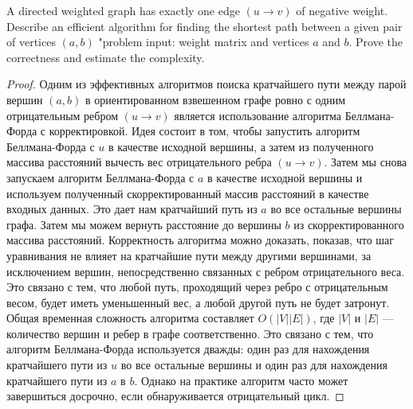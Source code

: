 \begin{prob}
A directed weighted graph has exactly one edge $(u \rightarrow v)$ of negative weight. Describe an efficient algorithm for finding the shortest path between a given pair of vertices $(a, b)$ "problem input: weight matrix and vertices $a$ and $b$. Prove the correctness and estimate the complexity.
\end{prob}
\vskip 0.2in
\begin{proof}
Одним из эффективных алгоритмов поиска кратчайшего пути между парой вершин $(a,b)$ в ориентированном взвешенном графе ровно с одним отрицательным ребром $(u \rightarrow v)$ является использование алгоритма Беллмана-Форда с корректировкой. Идея состоит в том, чтобы запустить алгоритм Беллмана-Форда с $u$ в качестве исходной вершины, а затем из полученного массива расстояний вычесть вес отрицательного ребра $(u \rightarrow v)$. Затем мы снова запускаем алгоритм Беллмана-Форда с $a$ в качестве исходной вершины и используем полученный скорректированный массив расстояний в качестве входных данных. Это дает нам кратчайший путь из $a$ во все остальные вершины графа. Затем мы можем вернуть расстояние до вершины $b$ из скорректированного массива расстояний. Корректность алгоритма можно доказать, показав, что шаг уравнивания не влияет на кратчайшие пути между другими вершинами, за исключением вершин, непосредственно связанных с ребром отрицательного веса. Это связано с тем, что любой путь, проходящий через ребро с отрицательным весом, будет иметь уменьшенный вес, а любой другой путь не будет затронут. Общая временная сложность алгоритма составляет $O(|V||E|)$, где $|V|$ и $|E|$ — количество вершин и ребер в графе соответственно. Это связано с тем, что алгоритм Беллмана-Форда используется дважды: один раз для нахождения кратчайшего пути из $u$ во все остальные вершины и один раз для нахождения кратчайшего пути из $a$ в $b$. Однако на практике алгоритм часто может завершиться досрочно, если обнаруживается отрицательный цикл.
\end{proof}
\vskip 0.6in

